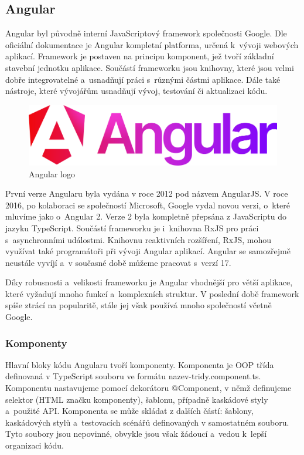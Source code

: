 \subsection{Angular}

Angular byl původně interní JavaScriptový framework společnosti Google. 
Dle oficiální dokumentace \cite{angulario} je Angular kompletní platforma, určená k~vývoji webových aplikací. 
Framework je postaven na principu komponent, jež tvoří základní stavební jednotku aplikace. 
Součástí frameworku jsou knihovny, které jsou velmi dobře integrovatelné a~usnadňují práci s~různými částmi aplikace. 
Dále také nástroje, které vývojářům usnadňují vývoj, testování či aktualizaci kódu.\cite{angulario,learningangular}

\begin{figure}[htb]
	\centering
		\includegraphics[width=.5\textwidth]{images/angular-logo.png}
	\caption[Angular logo]{Angular logo \cite{angulardev}}
	\label{fig:angularlogo}
\end{figure}

První verze Angularu byla vydána v roce 2012 pod názvem AngularJS. 
V roce 2016, po kolaboraci se společností Microsoft, Google vydal novou verzi, o~které mluvíme jako o~Angular 2. 
Verze 2 byla kompletně přepsána z JavaScriptu do jazyku TypeScript. 
Součástí frameworku je i~knihovna RxJS pro práci s~asynchronními událostmi. 
Knihovnu reaktivních rozšíření, RxJS, mohou využívat také programátoři při vývoji Angular aplikací. 
Angular se samozřejmě neustále vyvíjí a~v současné době můžeme pracovat s~verzí 17.\cite{angulardev,learningangular}

Díky robusnosti a~velikosti frameworku je Angular vhodnější pro větší aplikace, které vyžadují mnoho funkcí a~komplexních struktur. 
V poslední době framework spíše ztrácí na popularitě, stále jej však používá mnoho společností včetně Google.\cite{learningangular}

\subsubsection{Komponenty}

Hlavní bloky kódu Angularu tvoří komponenty. Komponenta je OOP třída definovaná v TypeScript souboru ve formátu nazev-tridy.component.ts. 
Komponentu nastavujeme pomocí dekorátoru @Component, v němž definujeme selektor (HTML značku komponenty), šablonu, případně kaskádové styly a~použité API. 
Komponenta se může skládat z dalších částí: šablony, kaskádových stylů a~testovacích scénářů definovaných v samostatném souboru. 
Tyto soubory jsou nepovinné, obvykle jsou však žádoucí a~vedou k~lepší organizaci kódu. 

